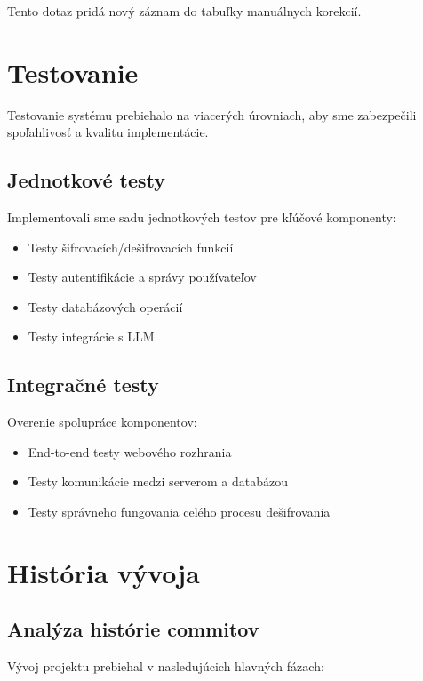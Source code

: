 \documentclass[12pt,a4paper]{article}
\begin{document}
Tento dotaz pridá nový záznam do tabuľky manuálnych korekcií.

\section{Testovanie}
Testovanie systému prebiehalo na viacerých úrovniach, aby sme zabezpečili spoľahlivosť a kvalitu implementácie.

\subsection{Jednotkové testy}
Implementovali sme sadu jednotkových testov pre kľúčové komponenty:
\begin{itemize}
    \item Testy šifrovacích/dešifrovacích funkcií
    \item Testy autentifikácie a správy používateľov
    \item Testy databázových operácií
    \item Testy integrácie s LLM
\end{itemize}

\subsection{Integračné testy}
Overenie spolupráce komponentov:
\begin{itemize}
    \item End-to-end testy webového rozhrania
    \item Testy komunikácie medzi serverom a databázou
    \item Testy správneho fungovania celého procesu dešifrovania
\end{itemize}

\section{História vývoja}
\subsection{Analýza histórie commitov}
Vývoj projektu prebiehal v nasledujúcich hlavných fázach:
\end{document}
